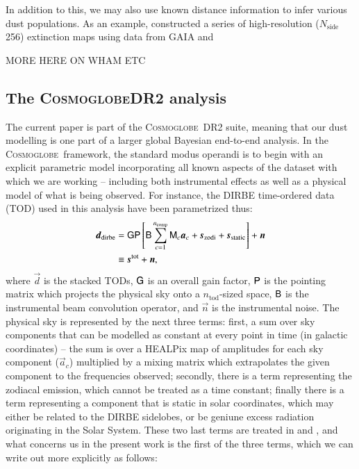 \documentclass{aa}
\newcommand{\dv}[0]{\vec{d}}
\newcommand{\s}[0]{\vec{s}}
\newcommand{\M}[0]{\tens{M}}
\renewcommand{\P}[0]{\tens{P}}
\newcommand{\G}[0]{\tens{G}}
\newcommand{\B}[0]{\tens{B}}
\renewcommand{\a}[0]{\vec{a}}
\newcommand{\n}[0]{\vec{n}}
\def\Cosmoglobe{\textsc{Cosmoglobe}}
\def\nside{$N_{\mathrm{side}}$}
\begin{document}
In addition to this, we may also use known distance information to infer
various dust populations. As an example, \cite{edenhofer:2024} constructed a
series of high-resolution (\nside 256) extinction maps using data from GAIA and

MORE HERE ON WHAM ETC

\subsection{The \Cosmoglobe DR2 analysis}
The current paper is part of the \Cosmoglobe\ DR2 suite, meaning that our dust
modelling is one part of a larger global Bayesian end-to-end analysis. In the
\Cosmoglobe\ framework, the standard modus operandi is to begin with an explicit
parametric model incorporating all known aspects of the dataset with which we
are working -- including both instrumental effects as well as a physical model
of what is being observed. For instance, the DIRBE time-ordered data (TOD) used
in this analysis have been parametrized thus:
\begin{align}
	\label{eq:model}
    \dv_{\mathrm{dirbe}} &=\G\P\left[\B\sum_{c=1}^{n_{\mathrm{comp}}}\M_c\a_c+\s_{\mathrm{zodi}} +
          \s_{\mathrm{static}}\right] + \n \\
                         & \equiv \s^{\mathrm{tot}} + \n \nonumber,
\end{align}
where $\dv$ is the stacked TODs, $\G$ is an overall gain factor, $\P$ is the
pointing matrix which projects the physical sky onto a $n_{\mathrm{tod}}$-sized
space, $\B$ is the instrumental beam convolution operator, and $\n$ is the
instrumental noise. The physical sky is represented by the next three terms:
first, a sum over sky components that can be modelled as constant at every
point in time (in galactic coordinates) -- the sum is over a HEALPix map of
amplitudes for each sky component ($\a_c$) multiplied by a mixing matrix which
extrapolates the given component to the frequencies observed; secondly, there
is a term representing the zodiacal emission, which cannot be treated as a time
constant; finally there is a term representing a component that is static in
solar coordinates, which may either be related to the DIRBE sidelobes, or be
geniune excess radiation originating in the Solar System. These two last terms
are treated in \citet{CG02_02} and \citet{CG02_03}, and what concerns us in the
present work is the first of the three terms, which we can write out more
explicitly as follows:
\end{document}
